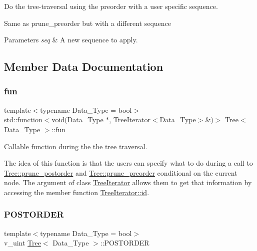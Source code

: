 Do the tree-\/traversal using the preorder with a user specific sequence. 

Same as {\ttfamily prune\+\_\+preorder} but with a different sequence 
\begin{DoxyParams}{Parameters}
{\em seq} & A new sequence to apply. \\
\hline
\end{DoxyParams}


\subsection{Member Data Documentation}
\mbox{\label{classTree_a00a788185abbb56febd0b122f62b9ec5}} 
\subsubsection{\texorpdfstring{fun}{fun}}
{\footnotesize\ttfamily template$<$typename Data\+\_\+\+Type = bool$>$ \\
std\+::function$<$void(Data\+\_\+\+Type $\ast$, \hyperlink{classTreeIterator}{Tree\+Iterator}$<$Data\+\_\+\+Type$>$\&)$>$ \hyperlink{classTree}{Tree}$<$ Data\+\_\+\+Type $>$\+::fun}



Callable function during the the tree traversal. 

The idea of this function is that the users can specify what to do during a call to \hyperlink{classTree_a7e50f34814e6f158cbff23dbe0312a8e}{Tree\+::prune\+\_\+postorder} and \hyperlink{classTree_a960ac327488daa6b2de86ea7be5aee7d}{Tree\+::prune\+\_\+preorder} conditional on the current node. The argument of class \hyperlink{classTreeIterator}{Tree\+Iterator} allows them to get that information by accessing the member function \hyperlink{classTreeIterator_a6666dce3a0d78f229bd26942ebb3ad94}{Tree\+Iterator\+::id}. \mbox{\label{classTree_a9cef7f2ba6064b21ce62ab2e7292332a}} 
\subsubsection{\texorpdfstring{P\+O\+S\+T\+O\+R\+D\+ER}{POSTORDER}}
{\footnotesize\ttfamily template$<$typename Data\+\_\+\+Type = bool$>$ \\
v\+\_\+uint \hyperlink{classTree}{Tree}$<$ Data\+\_\+\+Type $>$\+::P\+O\+S\+T\+O\+R\+D\+ER\hspace{0.3cm}{\ttfamily [protected]}}



